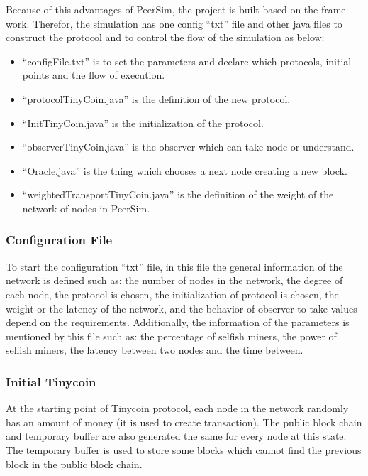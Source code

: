 \documentclass[runningheads,a4paper]{llncs}
\begin{document}
Because of this advantages of PeerSim, the project is built based on the frame work.
Therefor, the simulation has one config ``txt'' file and other java files to construct the protocol and to control the flow of the simulation as below:
\begin{itemize}
\item ``configFile.txt'' is to set the parameters and declare which protocols, initial points and the flow of execution.
\item ``protocolTinyCoin.java'' is the definition of the new protocol.
\item ``InitTinyCoin.java'' is the initialization of the protocol.
\item ``observerTinyCoin.java'' is the observer which can take node or understand.
\item ``Oracle.java'' is the thing which chooses a next node creating a new block.
\item ``weightedTransportTinyCoin.java'' is the definition of the weight of the network of nodes in PeerSim.
\end{itemize}

\subsubsection{Configuration File}
\label{ConfigFile}
To start the configuration ``txt'' file, in this file the general information of the network is defined such as: the number of nodes in the network, the degree of each node, the protocol is chosen, the initialization of protocol is chosen, the weight or the latency of the network, and the behavior of observer to take values depend on the requirements.
Additionally, the information of the parameters is mentioned by this file such as: the percentage of selfish miners, the power of selfish miners, the latency between two nodes and the time between.

\subsubsection{Initial Tinycoin}
At the starting point of Tinycoin protocol, each node in the network randomly has an amount of money (it is used to create transaction). The public block chain and temporary buffer are also generated the same for every node at this state. The temporary buffer is used to store some blocks which cannot find the previous block in the public block chain.
\end{document}
